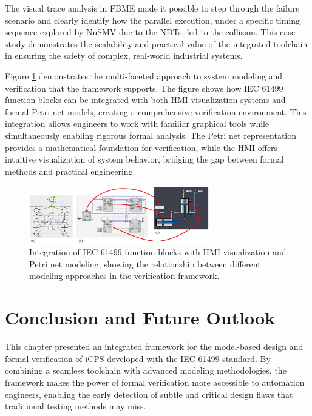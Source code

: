 The visual trace analysis in FBME made it possible to step through the failure scenario and clearly identify how the parallel execution, under a specific timing sequence explored by NuSMV due to the NDTs, led to the collision. This case study demonstrates the scalability and practical value of the integrated toolchain in ensuring the safety of complex, real-world industrial systems.

Figure \ref{fig:petri_hmi_iec} demonstrates the multi-faceted approach to system modeling and verification that the framework supports. The figure shows how IEC 61499 function blocks can be integrated with both HMI visualization systems and formal Petri net models, creating a comprehensive verification environment. This integration allows engineers to work with familiar graphical tools while simultaneously enabling rigorous formal analysis. The Petri net representation provides a mathematical foundation for verification, while the HMI offers intuitive visualization of system behavior, bridging the gap between formal methods and practical engineering.

\begin{figure}[h]
\centering
\includegraphics[width=0.7\textwidth]{chapters/images/chapter2/petri_hmi_iec.JPG}
\caption{Integration of IEC 61499 function blocks with HMI visualization and Petri net modeling, showing the relationship between different modeling approaches in the verification framework.}
\label{fig:petri_hmi_iec}
\end{figure}

\section{Conclusion and Future Outlook}\label{sec:conclusion_chapter2}

This chapter presented an integrated framework for the model-based design and formal verification of iCPS developed with the IEC 61499 standard. By combining a seamless toolchain with advanced modeling methodologies, the framework makes the power of formal verification more accessible to automation engineers, enabling the early detection of subtle and critical design flaws that traditional testing methods may miss.

